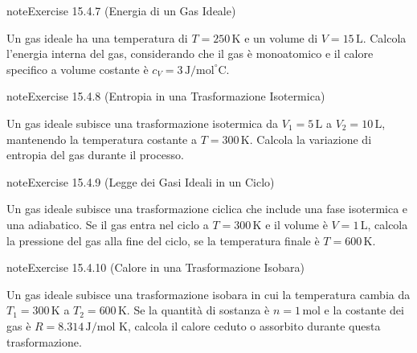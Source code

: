 \documentclass[letterpaper,10pt,italian]{jupyterBook}
\begin{document}
\begin{sphinxadmonition}{note}{Exercise 15.4.7 (Energia di un Gas Ideale)}



\sphinxAtStartPar
Un gas ideale ha una temperatura di \(T = 250 \, \text{K}\) e un volume di \(V = 15 \, \text{L}\). Calcola l’energia interna del gas, considerando che il gas è monoatomico e il calore specifico a volume costante è \(c_V = 3 \, \text{J/mol}^\circ \text{C}\).
\end{sphinxadmonition}
 \label{exercise:ch/thermodynamics/matter-problems-exercise-7}

\begin{sphinxadmonition}{note}{Exercise 15.4.8 (Entropia in una Trasformazione Isotermica)}



\sphinxAtStartPar
Un gas ideale subisce una trasformazione isotermica da \(V_1 = 5 \, \text{L}\) a \(V_2 = 10 \, \text{L}\), mantenendo la temperatura costante a \(T = 300 \, \text{K}\). Calcola la variazione di entropia del gas durante il processo.
\end{sphinxadmonition}
 \label{exercise:ch/thermodynamics/matter-problems-exercise-8}

\begin{sphinxadmonition}{note}{Exercise 15.4.9 (Legge dei Gasi Ideali in un Ciclo)}



\sphinxAtStartPar
Un gas ideale subisce una trasformazione ciclica che include una fase isotermica e una adiabatico. Se il gas entra nel ciclo a \(T = 300 \, \text{K}\) e il volume è \(V = 1 \, \text{L}\), calcola la pressione del gas alla fine del ciclo, se la temperatura finale è \(T = 600 \, \text{K}\).
\end{sphinxadmonition}
 \label{exercise:ch/thermodynamics/matter-problems-exercise-9}

\begin{sphinxadmonition}{note}{Exercise 15.4.10 (Calore in una Trasformazione Isobara)}



\sphinxAtStartPar
Un gas ideale subisce una trasformazione isobara in cui la temperatura cambia da \(T_1 = 300 \, \text{K}\) a \(T_2 = 600 \, \text{K}\). Se la quantità di sostanza è \(n = 1 \, \text{mol}\) e la costante dei gas è \(R = 8.314 \, \text{J/mol K}\), calcola il calore ceduto o assorbito durante questa trasformazione.
\end{sphinxadmonition}
 \label{exercise:ch/thermodynamics/matter-problems-exercise-10}
\end{document}
